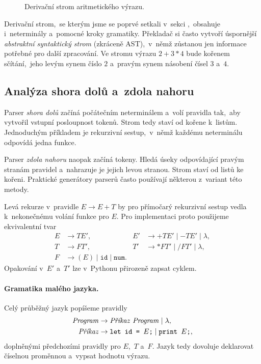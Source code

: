 \begin{figure}[h]
    \centering
    
    \caption{Derivační strom aritmetického výrazu.}
    \label{fig:strom-vyrazu}
\end{figure}

Derivační strom,~se kterým jsme se poprvé setkali v~sekci ,~obsahuje i~neterminály a~pomocné kroky gramatiky. Překladač si často vytvoří úspornější \emph{abstraktní syntaktický strom} (zkráceně AST),~v~němž zůstanou jen informace potřebné pro další zpracování. Ve stromu výrazu $2+3*4$ bude kořenem sčítání,~jeho levým synem číslo $2$ a~pravým synem násobení čísel $3$ a~$4$.

\subsection{Analýza shora dolů a~zdola nahoru}

Parser \emph{shora dolů} začíná počátečním neterminálem a~volí pravidla tak,~aby vytvořil vstupní posloupnost tokenů. Strom tedy staví od kořene k~listům. Jednoduchým příkladem je rekurzivní sestup,~v~němž každému neterminálu odpovídá jedna funkce.

Parser \emph{zdola nahoru} naopak začíná tokeny. Hledá úseky odpovídající pravým stranám pravidel a~nahrazuje je jejich levou stranou. Strom staví od listů ke kořeni. Praktické generátory parserů často používají některou z~variant této metody.

Levá rekurze v~pravidle $E\to E+T$ by pro přímočarý rekurzivní sestup vedla k~nekonečnému volání funkce pro $E$. Pro implementaci proto použijeme ekvivalentní tvar
\[
\begin{aligned}
    E&\to TE',&
    E'&\to +TE'\mid-TE'\mid\lambda,\\
    T&\to FT',&
    T'&\to *FT'\mid/FT'\mid\lambda,\\
    F&\to (E)\mid\texttt{id}\mid\texttt{num}.
\end{aligned}
\]
Opakování v~$E'$ a~$T'$ lze v~Pythonu přirozeně zapsat cyklem.

\paragraph{Gramatika malého jazyka.}

Celý průběžný jazyk popíšeme pravidly
\[
\begin{aligned}
    \mathit{Program}&\to\text{\textit{Příkaz}}\ \mathit{Program}\mid\lambda,\\
    \text{\textit{Příkaz}}&\to\texttt{let id = }E\texttt{;}
        \mid\texttt{print }E\texttt{;},
\end{aligned}
\]
doplněnými předchozími pravidly pro $E$,~$T$ a~$F$. Jazyk tedy dovoluje deklarovat číselnou proměnnou a~vypsat hodnotu výrazu.

